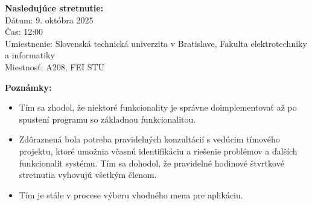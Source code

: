 \vspace{0.5cm}
\textbf{Nasledujúce stretnutie:} \\
Dátum: 9. októbra 2025 \\
Čas: 12:00 \\
Umiestnenie: Slovenská technická univerzita v Bratislave, Fakulta elektrotechniky a informatiky \\
Miestnosť: A208, FEI STU

\vspace{0.5cm}
\textbf{Poznámky:}
\begin{itemize}
    \item Tím sa zhodol, že niektoré funkcionality je správne doimplementovať až po spustení programu so základnou funkcionalitou.
    \item Zdôraznená bola potreba pravidelných konzultácií s vedúcim tímového projektu, ktoré umožnia včasnú identifikáciu a riešenie problémov a ďalších funkcionalít systému. Tím sa dohodol, že pravidelné hodinové štvrtkové stretnutia vyhovujú všetkým členom.
    \item Tím je stále v procese výberu vhodného mena pre aplikáciu.
\end{itemize}
